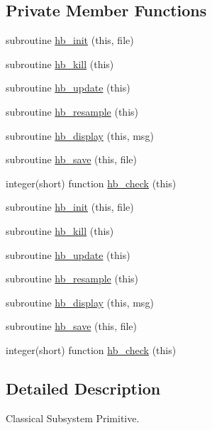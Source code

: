 \subsection*{Private Member Functions}
\begin{DoxyCompactItemize}
\item 
subroutine \hyperlink{classhb__class_aad89f206670f2c2396f92abf66cf9c1d}{hb\+\_\+init} (this, file)
\item 
subroutine \hyperlink{classhb__class_a696c9e145feab6ab780338ffcf6d6d4b}{hb\+\_\+kill} (this)
\item 
subroutine \hyperlink{classhb__class_a03d6e94665987e6ce2a283953632fb3f}{hb\+\_\+update} (this)
\item 
subroutine \hyperlink{classhb__class_a9d6faaa888c003d629e1b35f8b510832}{hb\+\_\+resample} (this)
\item 
subroutine \hyperlink{classhb__class_a8d8a7109913e9189fbc950d34378727b}{hb\+\_\+display} (this, msg)
\item 
subroutine \hyperlink{classhb__class_a53b39344e155580d8d2161a497774364}{hb\+\_\+save} (this, file)
\item 
integer(short) function \hyperlink{classhb__class_a84c1c4284b5897ff912c8c1671b6775f}{hb\+\_\+check} (this)
\item 
subroutine \hyperlink{classhb__class_aad89f206670f2c2396f92abf66cf9c1d}{hb\+\_\+init} (this, file)
\item 
subroutine \hyperlink{classhb__class_a696c9e145feab6ab780338ffcf6d6d4b}{hb\+\_\+kill} (this)
\item 
subroutine \hyperlink{classhb__class_a03d6e94665987e6ce2a283953632fb3f}{hb\+\_\+update} (this)
\item 
subroutine \hyperlink{classhb__class_a9d6faaa888c003d629e1b35f8b510832}{hb\+\_\+resample} (this)
\item 
subroutine \hyperlink{classhb__class_a8d8a7109913e9189fbc950d34378727b}{hb\+\_\+display} (this, msg)
\item 
subroutine \hyperlink{classhb__class_a53b39344e155580d8d2161a497774364}{hb\+\_\+save} (this, file)
\item 
integer(short) function \hyperlink{classhb__class_a84c1c4284b5897ff912c8c1671b6775f}{hb\+\_\+check} (this)
\end{DoxyCompactItemize}


\subsection{Detailed Description}
Classical Subsystem Primitive. 


